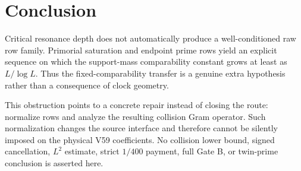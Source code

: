 \section{Conclusion}

Critical resonance depth does not automatically produce a well-conditioned raw row
family.  Primorial saturation and endpoint prime rows yield an explicit sequence on
which the support-mass comparability constant grows at least as $L/\log L$.  Thus the
fixed-comparability transfer is a genuine extra hypothesis rather than a consequence
of clock geometry.

This obstruction points to a concrete repair instead of closing the route: normalize
rows and analyze the resulting collision Gram operator.  Such normalization changes
the source interface and therefore cannot be silently imposed on the physical V59
coefficients.  No collision lower bound, signed cancellation, $L^2$ estimate, strict
$1/400$ payment, full Gate B, or twin-prime conclusion is asserted here.
